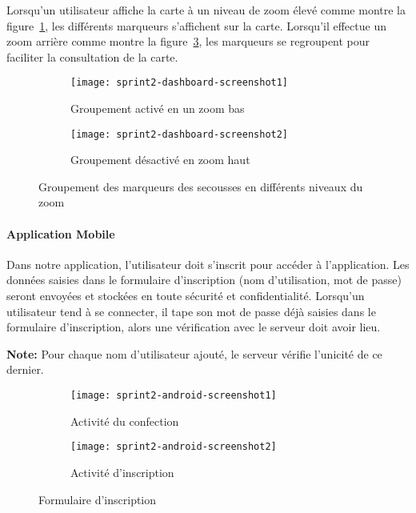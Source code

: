 Lorsqu'un utilisateur affiche la carte à un niveau de zoom élevé comme montre
la figure~\ref{fig:sprint2-dashboard-screenshot1}, les différents marqueurs
s'affichent sur la carte. Lorsqu'il effectue un zoom arrière comme montre la
figure~\ref{fig:sprint2-dashboard-screenshot2}, les marqueurs se regroupent
pour faciliter la consultation de la carte.

\begin{figure}[htbp]
    \begin{subfigure}{.5\textwidth}
        \centering
        \texttt{[image: sprint2-dashboard-screenshot1]}
        \caption{Groupement activé en un zoom bas}
        \label{fig:sprint2-dashboard-screenshot1}
    \end{subfigure}
    \begin{subfigure}{.5\textwidth}
        \centering
        \texttt{[image: sprint2-dashboard-screenshot2]}
        \caption{Groupement désactivé en zoom haut}
        \label{fig:sprint2-dashboard-screenshot2}
    \end{subfigure}
    \caption{Groupement des marqueurs des secousses en différents niveaux du zoom}
\end{figure}

\paragraph{Application Mobile }

Dans notre application, l'utilisateur doit s'inscrit pour accéder à
l'application. Les données saisies dans le formulaire d'inscription (nom
d'utilisation, mot de passe) seront envoyées et stockées en toute sécurité et
confidentialité. Lorsqu'un utilisateur tend à se connecter, il tape son mot de
passe déjà saisies dans le formulaire d'inscription, alors une vérification
avec le serveur doit avoir lieu.

\textbf{Note:} Pour chaque nom d'utilisateur ajouté, le serveur vérifie
l'unicité de ce dernier.

\begin{figure}[htbp]
    \begin{subfigure}{.5\textwidth}
        \centering
        \centering
        \texttt{[image: sprint2-android-screenshot1]}
        \caption{Activité du confection}
        \label{fig:sprint2-android-screenshot1}
    \end{subfigure}
    \begin{subfigure}{.5\textwidth}
        \centering
        \centering
        \texttt{[image: sprint2-android-screenshot2]}
        \caption{Activité d'inscription}
        \label{fig:sprint2-android-screenshot2}
    \end{subfigure}
    \caption{Formulaire d'inscription}
\end{figure}

